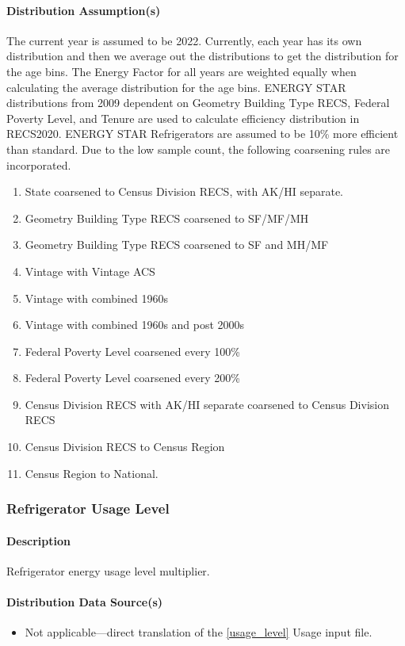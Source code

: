 \paragraph{Distribution Assumption(s)}
The current year is assumed to be 2022. Currently, each year has its own distribution and then we average out the distributions to get the distribution for the age bins. The Energy Factor for all years are weighted equally when calculating the average distribution for the age bins. ENERGY STAR distributions from 2009 dependent on Geometry Building Type RECS, Federal Poverty Level, and Tenure are used to calculate efficiency distribution in RECS2020. ENERGY STAR Refrigerators are assumed to be 10\% more efficient than standard. Due to the low sample count, the following coarsening rules are incorporated.
\begin{enumerate}
    \item  State coarsened to Census Division RECS, with AK/HI separate.
    \item Geometry Building Type RECS coarsened to SF/MF/MH 
    \item Geometry Building Type RECS coarsened to SF and MH/MF 
    \item  Vintage with Vintage ACS 
    \item Vintage with combined 1960s 
    \item Vintage with combined 1960s and post 2000s 
    \item  Federal Poverty Level coarsened every 100\% 
    \item  Federal Poverty Level coarsened every 200\% 
    \item Census Division RECS with AK/HI separate coarsened to Census Division RECS 
    \item  Census Division RECS to Census Region 
    \item Census Region to National. 
\end{enumerate}

\subsubsection{Refrigerator Usage Level}
\paragraph{Description}
Refrigerator energy usage level multiplier.
\paragraph{Distribution Data Source(s)}
\begin{itemize}
\item 

Not applicable---direct translation of the \ref{usage_level} Usage input file.
\end{itemize}


